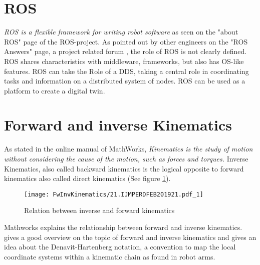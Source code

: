 \section{ROS}
\textit{\ac{ROS} is a flexible framework for writing robot software} as seen on the "about ROS" page of the ROS-project. As pointed out by other engineers on the "ROS Answers" page, a project related forum \cite{ROSAnswers_WhatIsRos}, the role of ROS is not clearly defined. ROS shares characteristics with middleware, frameworks, but also has \ac{OS}-like features. \ac{ROS} can take the Role of a \ac{DDS}, taking a central role in coordinating tasks and information on a distributed system of nodes. ROS can be used as a platform to create a digital twin.  %
\medskip

\section{Forward and inverse Kinematics}

As stated in the online manual of MathWorks, \textit{Kinematics is the study of motion without considering the cause of the motion, such as forces and torques.} \cite{MathWorksInverseKinematics}
Inverse Kinematics, also called backward kinematics is the logical opposite to forward kinematics also called direct kinematics (See figure \ref{fig:FwVsInvKin}). 


\begin{figure}[H]
	\texttt{[image: FwInvKinematics/21.IJMPERDFEB201921.pdf\_1]}
	\caption{Relation between inverse and forward kinematics \cite{SpaceStationManipulator}}
	\label{fig:FwVsInvKin}
\end{figure}







Mathworks \cite{forwardVsInverseKinematics} explains the relationship between forward and inverse kinematics.
\cite{allgInvKin} gives a good overview on the topic of forward and inverse kinematics and gives an idea about the Denavit-Hartenberg notation, a convention to map the local coordinate systems within a kinematic chain as found in robot arms.

